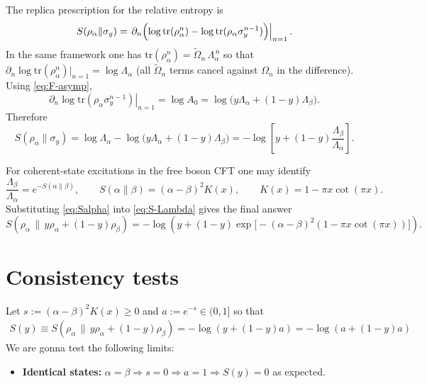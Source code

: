 \documentclass[11pt]{article}
\newcommand{\tr}{\mathrm{tr}}
\newcommand{\lb}{\left(}
\newcommand{\rb}{\right)}
\begin{document}
{  The replica prescription for the relative entropy is
  \begin{equation}
    S(\rho_{\alpha}\|\sigma_{y})= \left.\partial_{n}\Bigl(\log \tr(\rho_{\alpha}^{n}
    )-\log \tr(\rho_{\alpha}\sigma_{y}^{n-1})\Bigr)\right|_{n=1}. \label{eq:S-replica}
  \end{equation}
  In the same framework one has $\tr(\rho_{\alpha}^{n})=\widetilde\Omega_{n}\,\Lambda
  _{\alpha}^{\,n}$ so that $\partial_{n}\log \tr(\rho_{\alpha}^{n})|_{n=1}=\log\Lambda
  _{\alpha}$ (all $\widetilde \Omega_{n}$ terms cancel against $\Omega_{n}$ in
  the difference). Using \eqref{eq:F-asymp},
  \begin{equation}
    \left.\partial_{n}\log \tr(\rho_{\alpha}\sigma_{y}^{n-1})\right|_{n=1}=\log A
    _{0}=\log\!\bigl(y\Lambda_{\alpha}+(1-y)\Lambda_{\beta}\bigr).
  \end{equation}
  Therefore
  \begin{equation}
    S(\rho_{\alpha}\|\sigma_{y})=\log\Lambda_{\alpha}-\log\!\bigl(y\Lambda_{\alpha}
    +(1-y)\Lambda_{\beta}\bigr) = -\log\!\left[y+(1-y)\frac{\Lambda_{\beta}}{\Lambda_{\alpha}}
    \right]. \label{eq:S-Lambda}
  \end{equation}

  For coherent-state excitations in the free boson CFT one may identify
  \begin{equation}
    \frac{\Lambda_{\beta}}{\Lambda_{\alpha}}=e^{-S(\alpha\|\beta)}, \qquad S(\alpha
    \|\beta)=(\alpha-\beta)^{2}K(x), \qquad K(x)=1-\pi x\cot(\pi x). \label{eq:Salpha}
  \end{equation}
  Substituting \eqref{eq:Salpha} into \eqref{eq:S-Lambda} gives the final answer
  \begin{equation}
    \boxed{ S\!\left(\rho_\alpha\,\Big\|\,y\rho_\alpha+(1-y)\rho_\beta\right) = -\log\!\left( y+(1-y)\exp\!\big[-(\alpha-\beta)^2(1-\pi x\cot(\pi x))\big] \right). }
    \label{eq:S-final}
  \end{equation}

  \section{Consistency tests}
  \label{sec:tests}

  Let $s:=(\alpha-\beta)^{2}K(x)\ge 0$ and $a:=e^{-s}\in(0,1]$ so that
  \begin{eqnarray}
    S(y)\equiv S\!\left(\rho_\alpha\,\Big\|\,y\rho_\alpha+(1-y)\rho_\beta\right)=-\log\lb
    y+(1-y)a\rb=-\log(a+(1-y)a)
  \end{eqnarray}
  We are gonna test the following limits:
  \begin{itemize}
    \item \textbf{Identical states:}
      $\alpha=\beta\Rightarrow s=0\Rightarrow a=1\Rightarrow S(y)=0$ as expected.


\end{itemize}}
\end{document}
